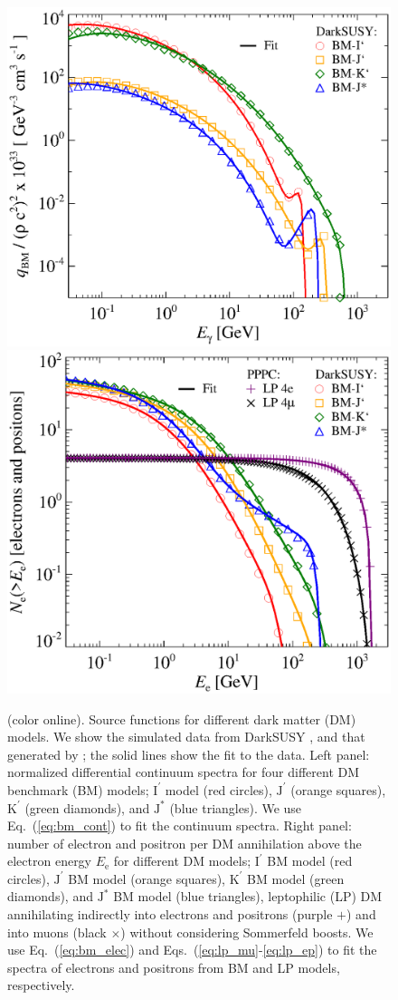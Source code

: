 \documentclass[10pt,aps,pra,reprint,amsmath,amsfonts,amssymb,showpacs,nofootinbib,floatfix]{revtex4-1}
\newcommand{\rmn}{\mathrm}
\newcommand{\ee}{E_\rmn{e}}
\newcommand{\Kp}{\rmn{K}^\prime}
\newcommand{\Ip}{\rmn{I}^\prime}
\newcommand{\Js}{\rmn{J}^*}
\newcommand{\Jp}{\rmn{J}^\prime}
\newcommand{\colo}{(color online). }
\begin{document}
\begin{figure}
\begin{minipage}{2.0\columnwidth}
 \includegraphics[width=0.49\columnwidth]{figures/fit.ds.flux.bw.eps}
 \includegraphics[width=0.49\columnwidth]{figures/fit.epflux.int.bw.eps}
 \caption{\colo Source functions for different dark
   matter (DM) models. We show the simulated data from {\sc DarkSUSY}
   \cite{ds}, and that generated by
   \protect\cite{2011JCAP...03..019C,2011JCAP...03..051C}; the solid
   lines show the fit to the data. Left panel: normalized differential
   continuum spectra for four different DM benchmark (BM) models;
   $\Ip$ model (red circles), $\Jp$ (orange squares), $\Kp$ (green
   diamonds), and $\Js$ (blue triangles). We use Eq.~(\ref{eq:bm_cont})
   to fit the continuum spectra. Right panel: number of electron and
   positron per DM annihilation above the electron energy $\ee$ for
   different DM models; $\Ip$ BM model (red circles), $\Jp$ BM model
   (orange squares), $\Kp$ BM model (green diamonds), and $\Js$ BM
   model (blue triangles), leptophilic (LP) DM annihilating indirectly
   into electrons and positrons (purple $+$) and into muons (black
   $\times$) without considering Sommerfeld boosts. We use
   Eq.~(\ref{eq:bm_elec}) and Eqs.~(\ref{eq:lp_mu}-\ref{eq:lp_ep}) to
   fit the spectra of electrons and positrons from BM and LP models,
   respectively.}
 \label{fig:q_DM}
\end{minipage}
\end{figure}
\end{document}
